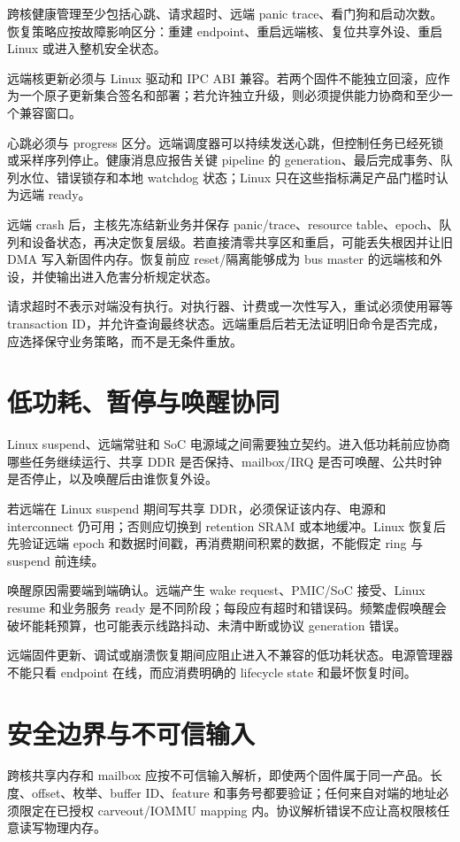 跨核健康管理至少包括心跳、请求超时、远端 panic trace、看门狗和启动次数。恢复策略应按故障影响区分：重建 endpoint、重启远端核、复位共享外设、重启 Linux 或进入整机安全状态。

远端核更新必须与 Linux 驱动和 IPC ABI 兼容。若两个固件不能独立回滚，应作为一个原子更新集合签名和部署；若允许独立升级，则必须提供能力协商和至少一个兼容窗口。

心跳必须与 progress 区分。远端调度器可以持续发送心跳，但控制任务已经死锁或采样序列停止。健康消息应报告关键 pipeline 的 generation、最后完成事务、队列水位、错误锁存和本地 watchdog 状态；Linux 只在这些指标满足产品门槛时认为远端 ready。

远端 crash 后，主核先冻结新业务并保存 panic/trace、resource table、epoch、队列和设备状态，再决定恢复层级。若直接清零共享区和重启，可能丢失根因并让旧 DMA 写入新固件内存。恢复前应 reset/隔离能够成为 bus master 的远端核和外设，并使输出进入危害分析规定状态。

请求超时不表示对端没有执行。对执行器、计费或一次性写入，重试必须使用幂等 transaction ID，并允许查询最终状态。远端重启后若无法证明旧命令是否完成，应选择保守业务策略，而不是无条件重放。

\section{低功耗、暂停与唤醒协同}

Linux suspend、远端常驻和 SoC 电源域之间需要独立契约。进入低功耗前应协商哪些任务继续运行、共享 DDR 是否保持、mailbox/IRQ 是否可唤醒、公共时钟是否停止，以及唤醒后由谁恢复外设。

若远端在 Linux suspend 期间写共享 DDR，必须保证该内存、电源和 interconnect 仍可用；否则应切换到 retention SRAM 或本地缓冲。Linux 恢复后先验证远端 epoch 和数据时间戳，再消费期间积累的数据，不能假定 ring 与 suspend 前连续。

唤醒原因需要端到端确认。远端产生 wake request、PMIC/SoC 接受、Linux resume 和业务服务 ready 是不同阶段；每段应有超时和错误码。频繁虚假唤醒会破坏能耗预算，也可能表示线路抖动、未清中断或协议 generation 错误。

远端固件更新、调试或崩溃恢复期间应阻止进入不兼容的低功耗状态。电源管理器不能只看 endpoint 在线，而应消费明确的 lifecycle state 和最坏恢复时间。

\section{安全边界与不可信输入}

跨核共享内存和 mailbox 应按不可信输入解析，即使两个固件属于同一产品。长度、offset、枚举、buffer ID、feature 和事务号都要验证；任何来自对端的地址必须限定在已授权 carveout/IOMMU mapping 内。协议解析错误不应让高权限核任意读写物理内存。

